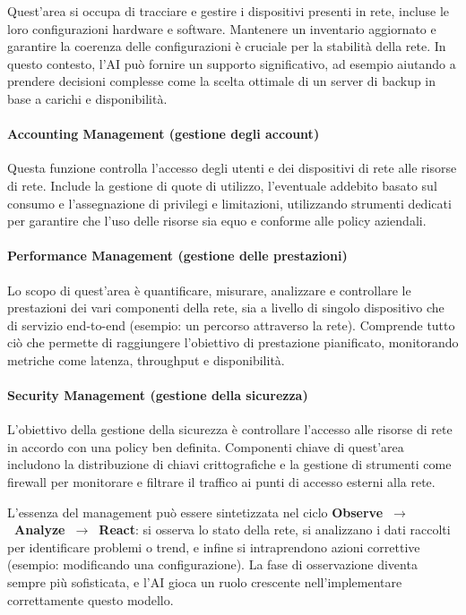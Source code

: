 Quest'area si occupa di tracciare e gestire i dispositivi presenti in rete,
incluse le loro configurazioni hardware e software. Mantenere un inventario
aggiornato e garantire la coerenza delle configurazioni è cruciale per la
stabilità della rete. In questo contesto, l'AI può fornire un supporto
significativo, ad esempio aiutando a prendere decisioni complesse come la scelta
ottimale di un server di backup in base a carichi e disponibilità.

\paragraph{Accounting Management (gestione degli account)}

Questa funzione controlla l'accesso degli utenti e dei dispositivi di rete alle
risorse di rete. Include la gestione di quote di utilizzo, l'eventuale addebito
basato sul consumo e l'assegnazione di privilegi e limitazioni, utilizzando
strumenti dedicati per garantire che l'uso delle risorse sia equo e conforme
alle policy aziendali.

\paragraph{Performance Management (gestione delle prestazioni)}

Lo scopo di quest'area è quantificare, misurare, analizzare e controllare le
prestazioni dei vari componenti della rete, sia a livello di singolo dispositivo
che di servizio end-to-end (esempio: un percorso attraverso la rete). Comprende
tutto ciò che permette di raggiungere l'obiettivo di prestazione pianificato,
monitorando metriche come latenza, throughput e disponibilità.

\paragraph{Security Management (gestione della sicurezza)}

L'obiettivo della gestione della sicurezza è controllare l'accesso alle risorse
di rete in accordo con una policy ben definita. Componenti chiave di quest'area
includono la distribuzione di chiavi crittografiche e la gestione di strumenti
come firewall per monitorare e filtrare il traffico ai punti di accesso esterni
alla rete.

L'essenza del management può essere sintetizzata nel ciclo
\textbf{Observe~$\to$~Analyze~$\to$~React}: si osserva lo stato della rete,
si analizzano i dati raccolti per identificare problemi o trend, e infine si
intraprendono azioni correttive (esempio: modificando una configurazione).
La fase di osservazione diventa sempre più sofisticata, e l'AI gioca un ruolo
crescente nell'implementare correttamente questo modello.

